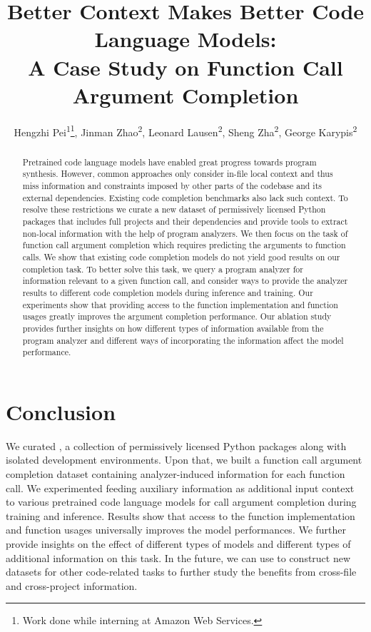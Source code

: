\documentclass[letterpaper]{article} %
\title{Better Context Makes Better Code Language Models: \\
A Case Study on Function Call Argument Completion}
\author{
    Hengzhi Pei\textsuperscript{\rm 1}\thanks{Work done while interning at Amazon Web Services.},
    Jinman Zhao\textsuperscript{\rm 2},
    Leonard Lausen\textsuperscript{\rm 2},
    Sheng Zha\textsuperscript{\rm 2},
    George Karypis\textsuperscript{\rm 2}
}
\begin{document}
\maketitle

\begin{abstract}
Pretrained code language models have enabled great progress towards program synthesis. However, common approaches only consider in-file local context and thus miss information and constraints imposed by other parts of the codebase and its external dependencies. Existing code completion benchmarks also lack such context. To resolve these restrictions we curate a new dataset of permissively licensed Python packages that includes full projects and their dependencies and provide tools to extract non-local information with the help of program analyzers. We then focus on the task of function call argument completion which requires predicting the arguments to function calls. We show that existing code completion models do not yield good results on our completion task. To better solve this task, we query a program analyzer for information relevant to a given function call, and consider ways to provide the analyzer results to different code completion models during inference and training. Our experiments show that providing access to the function implementation and function usages greatly improves the argument completion performance. Our ablation study provides further insights on how different types of information available from the program analyzer and different ways of incorporating the information affect the model performance.


\end{abstract}












\section{Conclusion}
We curated \PyEnvs, a collection of permissively licensed Python packages along with isolated development environments.
Upon that, we built a function call argument completion dataset \CallArgs containing analyzer-induced information for each function call.
We experimented feeding auxiliary information as additional input context to various pretrained code language models for call argument completion during training and inference.
Results show that access to the function implementation and function usages universally improves the model performances.
We further provide insights on the effect of different types of models and different types of additional information on this task.
In the future, we can use \PyEnvs to construct new datasets for other code-related tasks to further study the benefits from cross-file and cross-project information.
\end{document}
